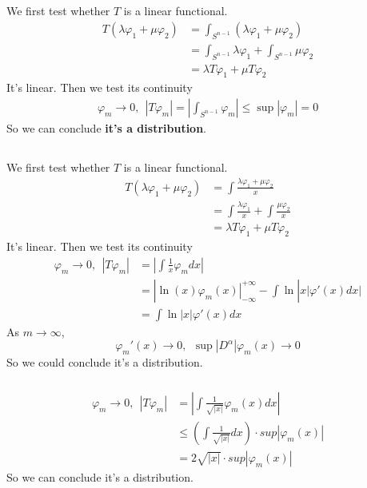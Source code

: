 \documentclass{article}
\begin{document}
\subsection{}
We first test whether $T$ is a linear functional.
\begin{align*}
T(\lambda \varphi_1 + \mu \varphi_2) &= \int_{S^{n-1}} (\lambda \varphi_1 + \mu \varphi_2) \\
	&= \int_{S^{n-1}} \lambda \varphi_1 +\int_{S^{n-1}}  \mu \varphi_2 \\
	&= \lambda T \varphi_1+ \mu T \varphi_2
\end{align*}
It's linear. Then we test its continuity
\begin{align*}
\varphi_m \rightarrow 0, \ \ |T \varphi_m| = |\int_{S^{n-1}}  \varphi_m| \leq \sup|\varphi_m| = 0
\end{align*}
So we can conclude \textbf{it's a distribution}.
\subsection{}
\subsubsection{}
We first test whether $T$ is a linear functional.
\begin{align*}
T(\lambda \varphi_1 + \mu \varphi_2) &= \int \frac{\lambda \varphi_1 + \mu \varphi_2}{x} \\
	&= \int \frac{\lambda \varphi_1}{x} + \int \frac{\mu \varphi_2}{x} \\
	&= \lambda T \varphi_1+ \mu T \varphi_2
\end{align*}
It's linear. Then we test its continuity
\begin{align*}
\varphi_m \rightarrow 0, \ \ |T \varphi_m| & = |\int \frac{1}{x}  \varphi_m dx| \\
&= |\left.\ln(x) \varphi_m(x)\right| _{-\infty}^{+ \infty} - \int \ln|x| \varphi'(x) dx| \\
&= \int \ln|x| \varphi'(x) dx
\end{align*}
As $m \rightarrow \infty$, \[
	\varphi_m'(x) \rightarrow 0,\ \  \sup|D^\alpha| \varphi_m(x) \rightarrow 0 
\]	
So we could conclude it's a distribution.
\subsubsection{}
\begin{align*}
\varphi_m \rightarrow 0, \ \ |T \varphi_m| & = |\int \frac{1}{\sqrt{|x|}}  \varphi_m(x) dx| \\
& \leq (\int \frac{1}{\sqrt{|x|}}dx)\cdot sup|\varphi_m(x)| \\
& = 2 \sqrt{|x|} \cdot sup|\varphi_m(x)|
\end{align*}
So we can conclude it's a distribution.
\end{document}
